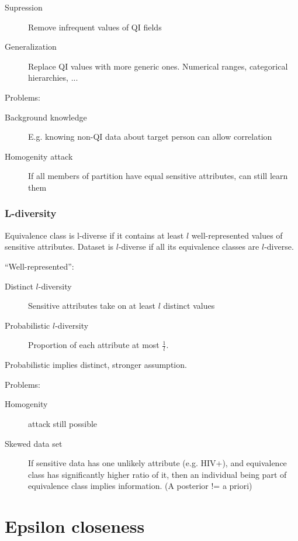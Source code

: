 \documentclass[a4paper]{scrreprt}
\begin{document}
\begin{description}
		\item[Supression] Remove infrequent values of QI fields
		\item[Generalization] Replace QI values with more generic ones. Numerical ranges, categorical hierarchies, ...
\end{description}

Problems:
\begin{description}
		\item[Background knowledge] E.g. knowing non-QI data about target person can allow correlation
		\item[Homogenity attack] If all members of partition have equal sensitive attributes, can still learn them
\end{description}

\subsection{L-diversity}

Equivalence class is l-diverse if it contains at least $l$ well-represented
values of sensitive attributes. Dataset is $l$-diverse if all its equivalence
classes are $l$-diverse.

``Well-represented'':
\begin{description}
		\item[Distinct $l$-diversity] Sensitive attributes take on at least $l$ distinct values
		\item[Probabilistic $l$-diversity] Proportion of each attribute at most $\frac{1}{l}$.
\end{description}

Probabilistic implies distinct, stronger assumption.

Problems:
\begin{description}
		\item[Homogenity] attack still possible
		\item[Skewed data set] If sensitive data has one unlikely attribute
				(e.g. HIV+), and equivalence class has significantly higher
				ratio of it, then an individual being part of equivalence class
				implies information. (A posterior != a priori)
\end{description}

\chapter{Epsilon closeness}
\end{document}
